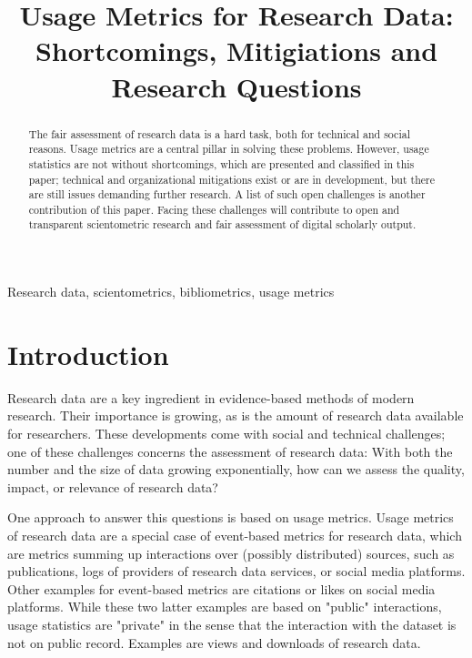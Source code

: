 \documentclass[conference, a4paper]{IEEEtran}\usepackage[]{graphicx}\usepackage[]{color}
\begin{document}
\title{Usage Metrics for Research Data:\\Shortcomings, Mitigiations and Research Questions}

\author{
}

\maketitle

\begin{abstract}
The fair assessment of research data is a hard task,
both for technical and social reasons.
Usage metrics are a central pillar in solving these problems.
However, usage statistics are not without shortcomings,
which are presented and classified in this paper;
technical and organizational mitigations exist or are in development,
but there are still issues demanding further research.
A list of such open challenges is another contribution of this paper.
Facing these challenges will contribute to open and transparent scientometric research
and fair assessment of digital scholarly output.
\end{abstract}

\begin{IEEEkeywords}
Research data, scientometrics, bibliometrics, usage metrics
\end{IEEEkeywords}

\section{Introduction}\label{sec:introduction}
Research data are a key ingredient in evidence-based methods of modern research.
Their importance is growing, as is the amount of research data available for researchers.
These developments come with social and technical challenges;
one of these challenges concerns the assessment of research data:
With both the number and the size of data growing exponentially,
how can we assess the quality, impact, or relevance of research data?

One approach to answer this questions is based on usage metrics.
Usage metrics of research data are a special case of event-based metrics for research data,
which are metrics summing up interactions over (possibly distributed) sources,
such as publications, logs of providers of research data services, or social media platforms.
Other examples for event-based metrics are citations or likes on social media platforms.
While these two latter examples are based on "public" interactions,
usage statistics are "private" in the sense that the interaction with the dataset
is not on public record.
Examples are views and downloads of research data.
\end{document}
